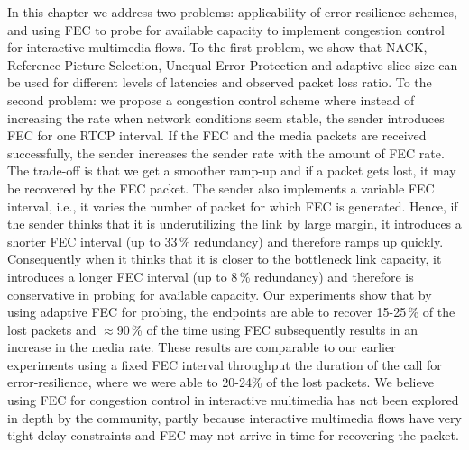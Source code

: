 In this chapter we address two problems: applicability of error-resilience
schemes, and using FEC to probe for available capacity to implement congestion
control for interactive multimedia flows. To the first problem, we show that
NACK, Reference Picture Selection, Unequal Error Protection and adaptive
slice-size can be used for different levels of latencies and observed packet
loss ratio. To the second problem: we propose a congestion control scheme
where instead of increasing the rate when network conditions seem stable, the
sender introduces FEC for one RTCP interval. If the FEC and the media packets
are received successfully, the sender increases the sender rate with the
amount of FEC rate. The trade-off is that we get a smoother ramp-up and if a
packet gets lost, it may be recovered by the FEC packet. The sender also
implements a variable FEC interval, i.e., it varies the number of packet for
which FEC is generated. Hence, if the sender thinks that it is underutilizing
the link by large margin, it introduces a shorter FEC interval (up to 33\,\%
redundancy) and therefore ramps up quickly. Consequently when it thinks that
it is closer to the bottleneck link capacity, it introduces a longer FEC
interval (up to 8\,\% redundancy) and therefore is conservative in probing for
available capacity. Our experiments show that by using adaptive FEC for
probing, the endpoints are able to recover 15-25\,\% of the lost packets and
$\approx$90\,\% of the time using FEC subsequently results in an increase in
the media rate. These results are comparable to our earlier experiments using
a fixed FEC interval throughput the duration of the call for error-resilience,
where we were able to 20-24\;\% of the lost packets. We believe using FEC for
congestion control in interactive multimedia has not been explored in depth by
the community, partly because interactive multimedia flows have very tight
delay constraints and FEC may not arrive in time for recovering the packet.

